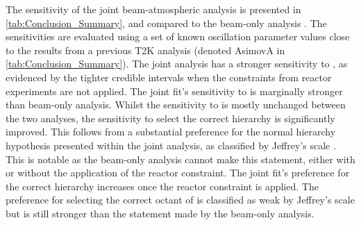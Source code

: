 
The sensitivity of the joint beam-atmospheric analysis is presented in \autoref{tab:Conclusion_Summary}, and compared to the beam-only analysis \cite{Dunne2020-uf}. The sensitivities are evaluated using a set of known oscillation parameter values close to the results from a previous T2K analysis \cite{PhysRevLett.112.181801} (denoted AsimovA in \autoref{tab:Conclusion_Summary}). The joint analysis has a stronger sensitivity to , as evidenced by the tighter \quickmath{1\sigma} credible intervals when the constraints from reactor experiments are not applied. The joint fit's sensitivity to  is marginally stronger than beam-only analysis.
Whilst the sensitivity to  is mostly unchanged between the two analyses, the sensitivity to select the correct hierarchy is significantly improved. This follows from a substantial preference for the normal hierarchy hypothesis presented within the joint analysis, as classified by Jeffrey's scale \cite{Jeffreys:1939xee}. This is notable as the beam-only analysis cannot make this statement, either with or without the application of the reactor constraint. The joint fit's preference for the correct hierarchy increases once the reactor constraint is applied. The preference for selecting the correct octant of  is classified as weak by Jeffrey's scale but is still stronger than the statement made by the beam-only analysis.

